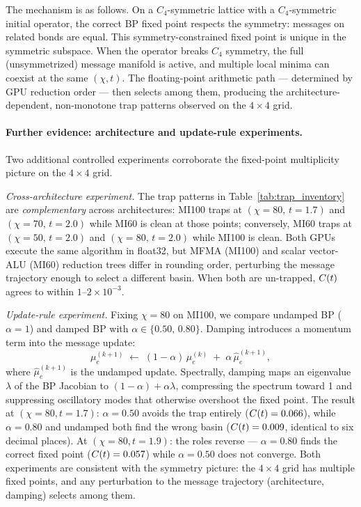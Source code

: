 The mechanism is as follows.
On a $C_4$-symmetric lattice with a $C_4$-symmetric initial operator, the
correct BP fixed point respects the symmetry: messages on related bonds are
equal.
This symmetry-constrained fixed point is unique in the symmetric subspace.
When the operator breaks $C_4$ symmetry, the full (unsymmetrized) message
manifold is active, and multiple local minima can coexist at the same $(\chi,
t)$.
The floating-point arithmetic path --- determined by GPU reduction order ---
then selects among them, producing the architecture-dependent, non-monotone
trap patterns observed on the $4\times4$ grid.

\paragraph{Further evidence: architecture and update-rule experiments.}
Two additional controlled experiments corroborate the fixed-point multiplicity
picture on the $4\times4$ grid.

\emph{Cross-architecture experiment.}
The trap patterns in Table~\ref{tab:trap_inventory} are \emph{complementary} across
architectures: MI100 traps at $(\chi=80,\,t=1.7)$ and $(\chi=70,\,t=2.0)$
while MI60 is clean at those points; conversely, MI60 traps at
$(\chi=50,\,t=2.0)$ and $(\chi=80,\,t=2.0)$ while MI100 is clean.
Both GPUs execute the same algorithm in float32, but MFMA (MI100) and
scalar vector-ALU (MI60) reduction trees differ in rounding order,
perturbing the message trajectory enough to select a different basin.
When both are un-trapped, $C(t)$ agrees to within $1$--$2\times10^{-3}$.

\emph{Update-rule experiment.}
Fixing $\chi=80$ on MI100, we compare undamped BP ($\alpha=1$) and damped BP
with $\alpha \in \{0.50,\, 0.80\}$.
Damping introduces a momentum term into the message update:
\begin{equation}
  \mu_e^{(k+1)}
  \;\leftarrow\;
  (1-\alpha)\,\mu_e^{(k)} \;+\; \alpha\,\hat{\mu}_e^{(k+1)},
  \label{eq:damping}
\end{equation}
where $\hat{\mu}_e^{(k+1)}$ is the undamped update.
Spectrally, damping maps an eigenvalue $\lambda$ of the BP Jacobian to
$(1-\alpha) + \alpha\lambda$, compressing the spectrum toward 1 and
suppressing oscillatory modes that otherwise overshoot the fixed point.
The result at $(\chi=80, t=1.7)$: $\alpha=0.50$ avoids the trap entirely
($C(t) = 0.066$), while $\alpha=0.80$ and undamped both find the wrong basin
($C(t) = 0.009$, identical to six decimal places).
At $(\chi=80, t=1.9)$: the roles reverse --- $\alpha=0.80$ finds the correct
fixed point ($C(t) = 0.057$) while $\alpha=0.50$ does not converge.
Both experiments are consistent with the symmetry picture: the $4\times4$ grid
has multiple fixed points, and any perturbation to the message trajectory
(architecture, damping) selects among them.

